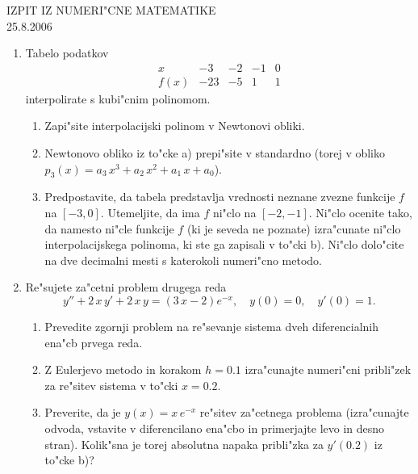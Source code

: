 \documentclass[12pt,a4paper]{article}
\begin{document}
\begin{center}
  {\large IZPIT IZ NUMERI"CNE MATEMATIKE\\
    25.8.2006}
\end{center}
\vspace{1.5cm}
\begin{enumerate}
\item Tabelo podatkov
  $$
    \begin{array}{r|llll}
    	x & -3 & -2 & -1 & 0 \\ \hline
    	f(x)& -23 & -5 &  1 &    1
    \end{array}
  $$
  interpolirate s kubi"cnim polinomom.
      \begin{enumerate}
        \item Zapi"site interpolacijski polinom v Newtonovi obliki. 
        \item Newtonovo obliko iz to"cke a) prepi"site
          v standardno (torej v obliko $p_3(x)=a_3\,x^3+
          a_2\,x^2+a_1\,x+a_0$).
        \item Predpostavite, da tabela predstavlja vrednosti
          neznane zvezne funkcije $f$ na $[-3,0]$.
          Utemeljite, da ima $f$ ni"clo na $[-2,-1]$. 
          Ni"clo ocenite tako, da namesto ni"cle funkcije $f$ (ki je
          seveda ne poznate) izra"cunate ni"clo interpolacijskega
          polinoma, ki ste ga zapisali v to"cki b). 
          Ni"clo dolo"cite na dve decimalni mesti s katerokoli
          numeri"cno metodo.
      \end{enumerate}
\item Re"sujete za"cetni problem drugega reda
  $$
    y''+2\,x\,y'+2\,x\,y=(3\,x-2)e^{-x},\quad y(0)=0,\quad y'(0)=1.
  $$
  \begin{enumerate}
    \item Prevedite zgornji problem na re"sevanje
      sistema dveh diferencialnih ena"cb prvega reda.
    \item Z Eulerjevo metodo in korakom $h=0.1$ 
      izra"cunajte numeri"cni pribli"zek za re"sitev
      sistema v to"cki $x=0.2$. 
    \item Preverite, da je
      $y(x)=x\,e^{-x}$ re"sitev za"cetnega problema 
      (iz\-ra\-"cu\-naj\-te
      odvoda, vstavite v diferencilano ena"cbo in primerjajte
      levo in desno stran).
      Kolik"sna je torej absolutna napaka pribli"zka za $y'(0.2)$
      iz to"cke b)?
  \end{enumerate}

\end{enumerate}
\end{document}
